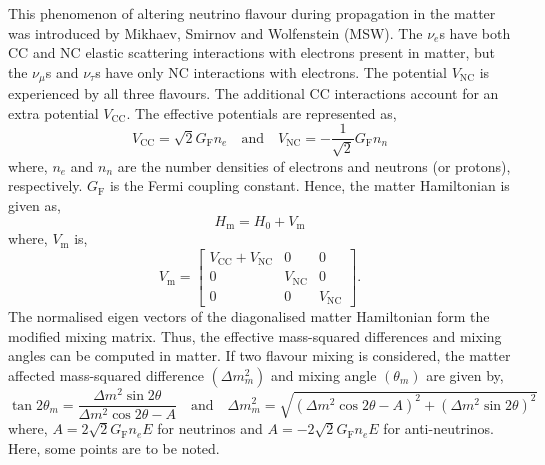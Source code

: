 This phenomenon of altering neutrino flavour during propagation in the matter was introduced by Mikhaev, Smirnov and Wolfenstein (MSW)\cite{msw1}. The $\nu_{e}$s have both CC and NC elastic scattering interactions with electrons present in matter, but the $\nu_{\mu}$s and $\nu_{\tau}$s have only NC interactions with electrons. The potential $V_{\textrm{NC}}$ is experienced by all three flavours. The additional CC interactions account for an extra potential $V_{\textrm{CC}}$. The effective potentials are represented as,
\begin{equation}
  V_{\textrm{CC}} = \sqrt{2}G_{\mathrm{F}}n_{e} \quad\text{and}\quad V_{\textrm{NC}} = -\frac{1}{\sqrt{2}}G_{\mathrm{F}}n_{n}
\end{equation}
where, $n_{e}$ and $n_{n}$ are the number densities of electrons and neutrons (or protons), respectively. $G_{\mathrm{F}}$ is the Fermi coupling constant. Hence, the matter Hamiltonian is given as,
\begin{equation}
  H_{\mathrm{m}} = H_{0}+V_{\mathrm{m}}
\end{equation}
where, $V_{\mathrm{m}}$ is,
\begin{equation}
  V_{\mathrm{m}} =
  \begin{bmatrix}
    V_{\textrm{CC}} + V_{\textrm{NC}} & 0 & 0 \\
    0 & V_{\textrm{NC}} & 0 \\
    0 & 0 & V_{\textrm{NC}}
  \end{bmatrix}.
\end{equation}
The normalised eigen vectors of the diagonalised matter Hamiltonian form the modified mixing matrix. Thus, the effective mass-squared differences and mixing angles can be computed in matter. If two flavour mixing is considered, the matter affected mass-squared difference $\left(\Delta m^{2}_{m}\right)$ and mixing angle $\left(\theta_{m}\right)$ are given by,
\begin{equation}
  \tan 2\theta_{m}=\frac{\Delta m^{2}\sin 2\theta}{\Delta m^{2}\cos 2\theta -A} \quad\text{and}\quad \Delta m^{2}_{m} = \sqrt{\left(\Delta m^{2}\cos 2\theta -A\right)^{2} + \left(\Delta m^{2}\sin 2\theta\right)^{2}} \label{eq:mattermass}
\end{equation}
where, $A=2\sqrt{2}G_{\mathrm{F}}n_{e}E$ for neutrinos and $A=-2\sqrt{2}G_{\mathrm{F}}n_{e}E$ for anti-neutrinos. Here, some points are to be noted.
